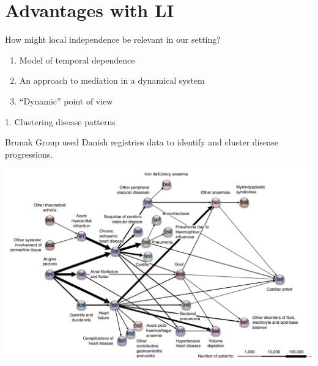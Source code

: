\documentclass{beamer}\usepackage{listings}
\begin{document}
\section{Advantages with LI}
\label{sec:orgd253c78}
\begin{frame}[label={sec:org9cd8fae}]{How might local independence be relevant in our setting?}
\pause
\begin{enumerate}
\item Model of temporal dependence \pause
\item An approach to mediation in a dynamical system \pause
\item ``Dynamic'' point of view
\end{enumerate}
\end{frame}
\begin{frame}[label={sec:org8dc5e16}]{1. Clustering disease patterns}
\begin{block}{Brunak Group}
\cite{jensen2014temporal} used Danish registries data to identify and cluster disease progressions.

\pause

\begin{center}
\includegraphics[width=.9\linewidth]{./figs/Brunak-disease-cluster.png}
\end{center}
\end{block}
\end{frame}
\end{document}
